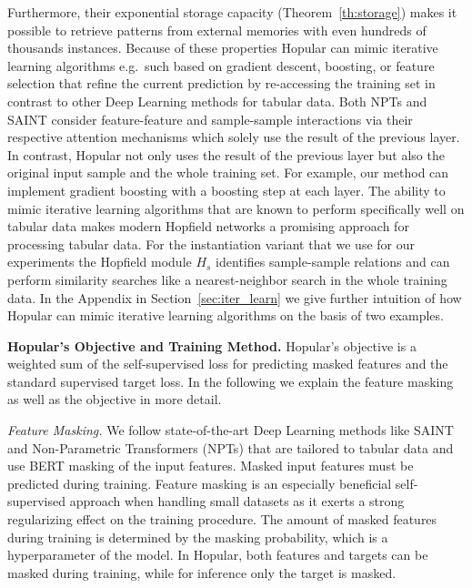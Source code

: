\documentclass{article}
\theoremstyle{plain}
\theoremstyle{definition}
\theoremstyle{remark}
\begin{document}
Furthermore, their exponential storage capacity (Theorem~\ref{th:storage}) makes it possible to
retrieve patterns from external memories with even hundreds of thousands
instances.
Because of these properties Hopular can mimic iterative learning algorithms e.g.\ such based on gradient descent, boosting, or feature selection that refine the current prediction by re-accessing the training set in contrast to other Deep Learning methods for tabular data. Both NPTs and SAINT consider feature-feature and sample-sample interactions via their respective attention mechanisms which solely use the result of the previous layer. In contrast, Hopular not only uses the result of the previous layer but also the original input sample and the whole training set.
For example, our method can implement gradient boosting with a boosting step at each layer.
The ability to mimic iterative learning algorithms that are known to perform specifically well on tabular data makes modern Hopfield networks a promising
approach for processing tabular data.
For the instantiation variant that we use for our experiments
the Hopfield module $H_{s}$ identifies sample-sample relations
and can perform similarity searches like a nearest-neighbor search 
in the whole training data.
In the Appendix in Section~\ref{sec:iter_learn}
we give further intuition of how Hopular
can mimic iterative learning algorithms on the basis of two examples.

{\bf Hopular's Objective and Training Method.}
Hopular's objective is a weighted sum of 
the self-supervised loss for predicting masked features and
the standard supervised target loss.
In the following we explain the feature masking as well as the objective in more detail.

{\em Feature Masking.} 
We follow state-of-the-art Deep Learning methods 
like SAINT \citep{Somepalli:21}
and Non-Parametric Transformers (NPTs) \citep{Kossen:21}
that are tailored to tabular data and 
use BERT masking \citep{Devlin:19} of the input features.
Masked input features must be predicted during training.
Feature masking is an especially beneficial self-supervised approach when 
handling small datasets as it exerts a 
strong regularizing effect on the training procedure. 
The amount of masked features during training is 
determined by the masking probability, which is a hyperparameter of the model.
In Hopular, both features and targets can be masked during training,
while for inference only the target is masked.
\end{document}
